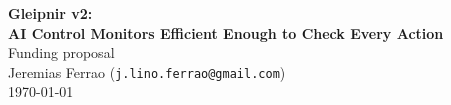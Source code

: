 \documentclass[11pt]{article}
\newcommand{\proposaltitle}{Gleipnir v2:\\[2pt] AI Control Monitors Efficient Enough to Check Every Action}
\begin{document}
\begin{center}
    {\LARGE\bfseries\color{accent}\proposaltitle}\\[6pt]
    {\large Funding proposal}\\[4pt]
    Jeremias Ferrao (\texttt{j.lino.ferrao@gmail.com})\\[2pt]
    \today
\end{center}











\end{document}

